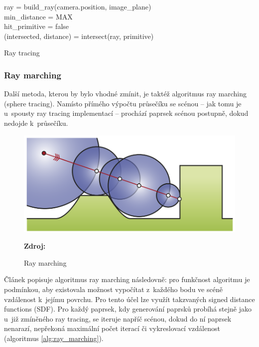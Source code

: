 \begin{center}
	\begin{czechalgorithm}[H] \label{alg:rt_1}
		ray = build\_ray(camera.position, image\_plane)\\
		min\_distance = MAX\\
		hit\_primitive = false\\
		 {
			(intersected, distance) = intersect(ray, primitive)\\
		}
		\caption{Ray tracing}
	\end{czechalgorithm}
\end{center}

\subsubsection{Ray marching}
Další metoda, kterou by bylo vhodné zmínit, je taktéž algoritmus ray marching (sphere tracing). Namísto přímého výpočtu průsečíku se scénou -- jak tomu je u~spousty ray tracing implementací -- prochází paprsek scénou postupně, dokud nedojde k~průsečíku.

\begin{figure}[H]
	\centering
	\includegraphics[scale=0.8]{obrazky-figures/ray_marching.png}
	\caption{Ray marching}
	\textbf{Zdroj: \cite{Keinert2014EnhancedST}}
	\label{fig:ray_marching}
\end{figure}

Článek \cite{sphere_tracing} popisuje algoritmus ray marching následovně: pro funkčnost algoritmu je podmínkou, aby existovala možnost vypočítat z~každého bodu ve scéně vzdálenost k~jejímu povrchu. Pro tento účel lze využít takzvaných signed distance functions (SDF). Pro každý paprsek, kdy generování paprsků probíhá stejně jako u~již zmíněného ray tracing, se iteruje napříč scénou, dokud do ní paprsek nenarazí, nepřekoná maximální počet iterací či vykreslovací vzdálenost (algoritmus \ref{alg:ray_marching}).


